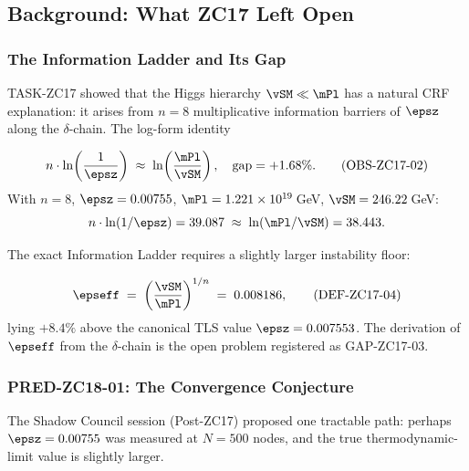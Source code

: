 \documentclass[12pt, a4paper]{article}
\begin{document}
\tableofcontents
\newpage

\subsection{Background: What ZC17 Left Open}
\label{zc18a:sec:background}

\subsubsection{The Information Ladder and Its Gap}

TASK-ZC17 showed that the Higgs hierarchy $\vSM\ll\mPl$ has a natural
CRF explanation: it arises from $n=8$ multiplicative information
barriers of $\epsz$ along the $\delta$-chain.
The log-form identity

\begin{derivedbox}[title={OBS-ZC17-02: Information Ladder at $1.68\%$ (from ZC17)}]
\begin{equation}
  n\cdot\ln\!\left(\frac{1}{\epsz}\right)
  \;\approx\; \ln\!\left(\frac{\mPl}{\vSM}\right),
  \quad \text{gap} = +1.68\%.
  \tag{OBS-ZC17-02}
\end{equation}
With $n=8$, $\epsz=0.00755$, $\mPl=1.221\times10^{19}$\,GeV,
$\vSM=246.22$\,GeV:
\[
  n\cdot\ln(1/\epsz) = 39.087
  \;\approx\;
  \ln(\mPl/\vSM) = 38.443.
\]
\end{derivedbox}

The exact Information Ladder requires a slightly larger instability floor:

\begin{formalbox}[title={DEF-ZC17-04: Effective $\varepsilon_0$ (from ZC17)}]
\begin{equation}
  \epseff
  \;=\; \left(\frac{\vSM}{\mPl}\right)^{1/n}
  \;=\; 0.008186,
  \tag{DEF-ZC17-04}
\end{equation}
lying $+8.4\%$ above the canonical TLS value $\epsz = 0.007553$.
The derivation of $\epseff$ from the $\delta$-chain is the open
problem registered as GAP-ZC17-03.
\end{formalbox}

\subsubsection{PRED-ZC18-01: The Convergence Conjecture}

The Shadow Council session (Post-ZC17) proposed one tractable path:
perhaps $\epsz = 0.00755$ was measured at $N=500$ nodes, and the true
thermodynamic-limit value is slightly larger.
\end{document}
